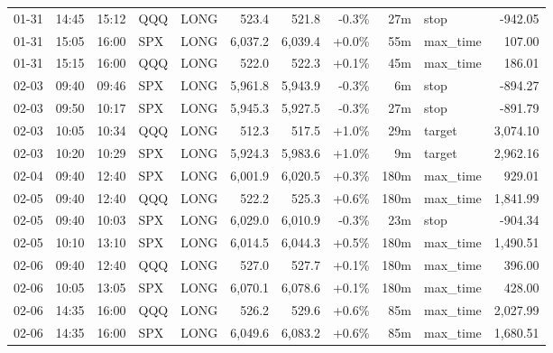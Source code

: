 \documentclass[11pt,a4paper,twoside]{article}
\begin{document}
\begin{center}
\begin{longtable}{>{\color{txtmain}}l l l l l r r r r >{\color{txtmain}}l r}
01-31 & 14:45 & 15:12 & QQQ & LONG & 523.4 & 521.8 & \textcolor{lossred}{-0.3\%} & 27m & stop & \textcolor{lossred}{-942.05} \\
01-31 & 15:05 & 16:00 & SPX & LONG & 6,037.2 & 6,039.4 & \textcolor{wingreen}{+0.0\%} & 55m & max\_time & \textcolor{wingreen}{107.00} \\
01-31 & 15:15 & 16:00 & QQQ & LONG & 522.0 & 522.3 & \textcolor{wingreen}{+0.1\%} & 45m & max\_time & \textcolor{wingreen}{186.01} \\
02-03 & 09:40 & 09:46 & SPX & LONG & 5,961.8 & 5,943.9 & \textcolor{lossred}{-0.3\%} & 6m & stop & \textcolor{lossred}{-894.27} \\
02-03 & 09:50 & 10:17 & SPX & LONG & 5,945.3 & 5,927.5 & \textcolor{lossred}{-0.3\%} & 27m & stop & \textcolor{lossred}{-891.79} \\
02-03 & 10:05 & 10:34 & QQQ & LONG & 512.3 & 517.5 & \textcolor{wingreen}{+1.0\%} & 29m & target & \textcolor{wingreen}{3,074.10} \\
02-03 & 10:20 & 10:29 & SPX & LONG & 5,924.3 & 5,983.6 & \textcolor{wingreen}{+1.0\%} & 9m & target & \textcolor{wingreen}{2,962.16} \\
02-04 & 09:40 & 12:40 & SPX & LONG & 6,001.9 & 6,020.5 & \textcolor{wingreen}{+0.3\%} & 180m & max\_time & \textcolor{wingreen}{929.01} \\
02-05 & 09:40 & 12:40 & QQQ & LONG & 522.2 & 525.3 & \textcolor{wingreen}{+0.6\%} & 180m & max\_time & \textcolor{wingreen}{1,841.99} \\
02-05 & 09:40 & 10:03 & SPX & LONG & 6,029.0 & 6,010.9 & \textcolor{lossred}{-0.3\%} & 23m & stop & \textcolor{lossred}{-904.34} \\
02-05 & 10:10 & 13:10 & SPX & LONG & 6,014.5 & 6,044.3 & \textcolor{wingreen}{+0.5\%} & 180m & max\_time & \textcolor{wingreen}{1,490.51} \\
02-06 & 09:40 & 12:40 & QQQ & LONG & 527.0 & 527.7 & \textcolor{wingreen}{+0.1\%} & 180m & max\_time & \textcolor{wingreen}{396.00} \\
02-06 & 10:05 & 13:05 & SPX & LONG & 6,070.1 & 6,078.6 & \textcolor{wingreen}{+0.1\%} & 180m & max\_time & \textcolor{wingreen}{428.00} \\
02-06 & 14:35 & 16:00 & QQQ & LONG & 526.2 & 529.6 & \textcolor{wingreen}{+0.6\%} & 85m & max\_time & \textcolor{wingreen}{2,027.99} \\
02-06 & 14:35 & 16:00 & SPX & LONG & 6,049.6 & 6,083.2 & \textcolor{wingreen}{+0.6\%} & 85m & max\_time & \textcolor{wingreen}{1,680.51} \\

\end{longtable}
\end{center}
\end{document}
